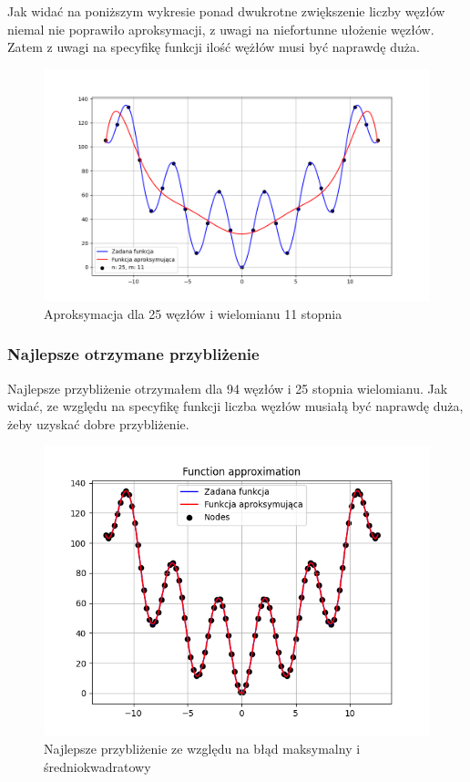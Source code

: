 \documentclass{article}
\begin{document}
\newpage

Jak widać na poniższym wykresie ponad dwukrotne zwiększenie liczby węzłów niemal nie poprawiło aproksymacji, z uwagi na niefortunne ułożenie węzłów. Zatem z uwagi na specyfikę funkcji ilość wężłów musi być naprawdę duża.

\begin{figure}[H]
\centering
  \begin{minipage}[b]{0.49\textwidth}
    \includegraphics[width=\textwidth]{img27_n=25_m=11.png}
    \caption{Aproksymacja dla 25 węzłów i wielomianu 11 stopnia}
  \end{minipage}
\end{figure}

\subsubsection{Najlepsze otrzymane przybliżenie}

Najlepsze przybliżenie otrzymałem dla 94 węzłów i 25 stopnia wielomianu. Jak widać, ze względu na specyfikę funkcji liczba węzłów musiałą być naprawdę duża, żeby uzyskać dobre przybliżenie.

\begin{figure}[H]
\centering
  \begin{minipage}[b]{0.49\textwidth}
    \includegraphics[width=\textwidth]{img28.png}
    \caption{Najlepsze przybliżenie ze względu na błąd maksymalny i średniokwadratowy}
  \end{minipage}
\end{figure}
\end{document}
